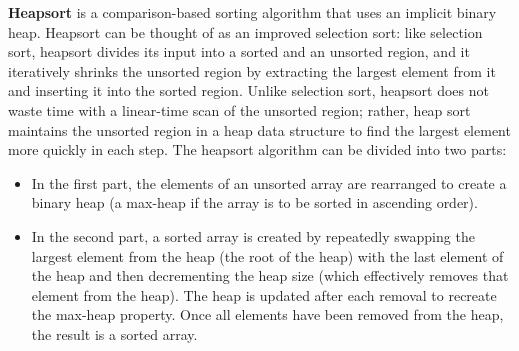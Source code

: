 \documentclass{report}
\begin{document}
    \pagebreak 
    \bigbreak \noindent 
    \begin{concept}
        \textbf{Heapsort} is a comparison-based sorting algorithm that uses an implicit binary heap. Heapsort can be thought of as an improved selection sort: like selection sort, heapsort divides its input into a sorted and an unsorted region, and it iteratively shrinks the unsorted region by extracting the largest element from it and inserting it into the sorted region. Unlike selection sort, heapsort does not waste time with a linear-time scan of the unsorted region; rather, heap sort maintains the unsorted region in a heap data structure to find the largest element more quickly in each step.
        \bigbreak \noindent 
        The heapsort algorithm can be divided into two parts:
        \begin{itemize}
            \item In the first part, the elements of an unsorted array are rearranged to create a binary heap (a max-heap if the array is to be sorted in ascending order).
            \item In the second part, a sorted array is created by repeatedly swapping the largest element from the heap (the root of the heap) with the last element of the heap and then decrementing the heap size (which effectively removes that element from the heap). The heap is updated after each removal to recreate the max-heap property. Once all elements have been removed from the heap, the result is a sorted array.
        \end{itemize}
    \end{concept}
    \bigbreak \noindent 

    \pagebreak 
\end{document}
